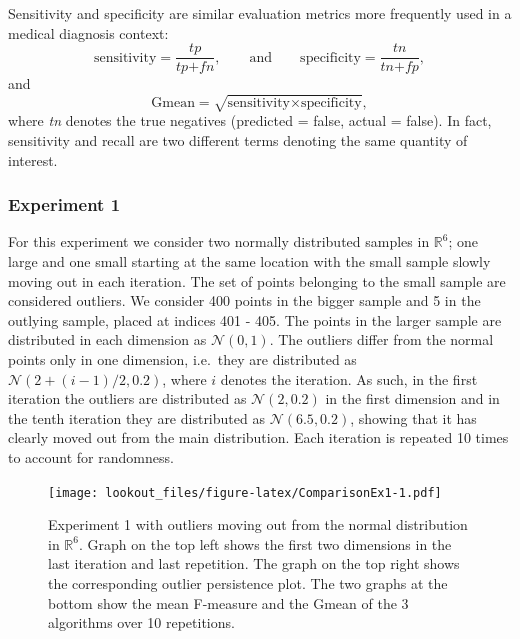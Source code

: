 \documentclass[11pt,a4paper,]{article}
\theoremstyle{definition}
\theoremstyle{definition}
\theoremstyle{definition}
\theoremstyle{remark}
\begin{document}
Sensitivity and specificity are similar evaluation metrics more frequently used in a medical diagnosis context:
\begin{equation}\label{eq:ss}
    \text{sensitivity} = \frac{ \textit{tp} }{\textit{tp} + \textit{fn}}  , \qquad \text{and} \qquad \text{specificity} = \frac{\textit{tn}}{\textit{tn} + \textit{fp}}  ,
\end{equation}
and
\begin{equation}\label{eq:gmean}
    \text{Gmean} = \sqrt{ \text{sensitivity} \times \text{specificity}}  ,
\end{equation}
where \emph{tn} denotes the true negatives (predicted = false, actual = false). In fact, sensitivity and recall are two different terms denoting the same quantity of interest.

\hypertarget{experiment-1}{%
\subsubsection*{Experiment 1}\label{experiment-1}}

For this experiment we consider two normally distributed samples in \(\mathbb{R}^6\); one large and one small starting at the same location with the small sample slowly moving out in each iteration. The set of points belonging to the small sample are considered outliers. We consider 400 points in the bigger sample and 5 in the outlying sample, placed at indices 401 - 405. The points in the larger sample are distributed in each dimension as \(\mathcal{N}(0, 1)\). The outliers differ from the normal points only in one dimension, i.e.~they are distributed as \(\mathcal{N}\left(2 + (i-1)/2, 0.2 \right)\), where \(i\) denotes the iteration. As such, in the first iteration the outliers are distributed as \(\mathcal{N}\left(2 , 0.2 \right)\) in the first dimension and in the tenth iteration they are distributed as \(\mathcal{N}\left(6.5 , 0.2 \right)\), showing that it has clearly moved out from the main distribution. Each iteration is repeated 10 times to account for randomness.

\begin{figure}
\centering
\texttt{[image: lookout\_files/figure-latex/ComparisonEx1-1.pdf]}
\caption{\label{fig:ComparisonEx1}Experiment 1 with outliers moving out from the normal distribution in \(\mathbb{R}^6\). Graph on the top left shows the first two dimensions in the last iteration and last repetition. The graph on the top right shows the corresponding outlier persistence plot. The two graphs at the bottom show the mean F-measure and the Gmean of the 3 algorithms over 10 repetitions.}
\end{figure}
\end{document}
